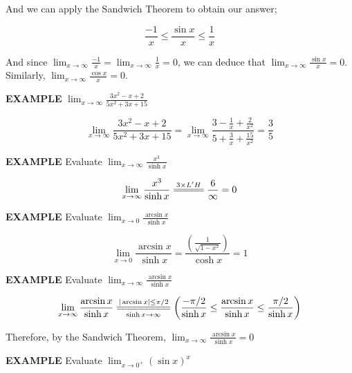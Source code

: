 \documentclass{article}
\begin{document}
\vspace{10pt}

And we can apply the Sandwich Theorem to obtain our answer;

\[\frac{-1}{x}\leq\frac{\sin x}{x}\leq\frac{1}{x}\]

\vspace{10pt}

And since $\lim_{x\to\infty}\frac{-1}{x}=\lim_{x\to\infty}\frac{1}{x}=0$, we can deduce that $\lim_{x\to\infty}\frac{\sin x}{x}=0$. Similarly, $\lim_{x\to\infty}\frac{\cos x}{x}=0$.

\vspace{10pt}

{\bf{}EXAMPLE} $\displaystyle\lim_{x\to\infty}\frac{3x^2-x+2}{5x^2+3x+15}$

\[\lim_{x\to\infty}\frac{3x^2-x+2}{5x^2+3x+15}=\lim_{x\to\infty}\frac{3-\frac{1}{x}+\frac{2}{x^2}}{5+\frac{3}{x}+\frac{15}{x^2}}=\frac{3}{5}\]

\vspace{10pt}

{\bf{}EXAMPLE} Evaluate $\displaystyle\lim_{x\to\infty}\frac{x^3}{\sinh x}$

\[\lim_{x\to\infty}\frac{x^3}{\sinh x}\overset{3\times L'H}{=\joinrel=\joinrel=\joinrel=\joinrel=}\frac{6}{\infty}=0\]

\vspace{10pt}

{\bf{}EXAMPLE} Evaluate $\displaystyle\lim_{x\to0}\frac{\arcsin x}{\sinh x}$

\[\lim_{x\to0}\frac{\arcsin x}{\sinh x}=\frac{\left(\frac{1}{\sqrt{1-x^2}}\right)}{\cosh x}=1\]

\vspace{10pt}

{\bf{}EXAMPLE} Evaluate $\displaystyle\lim_{x\to\infty}\frac{\arcsin x}{\sinh x}$

\[\lim_{x\to\infty}\frac{\arcsin x}{\sinh x}\overset{|\arcsin x|\leq\pi/2}{\underset{\sinh x\to\infty}{=\joinrel=\joinrel=\joinrel=\joinrel=\joinrel=\joinrel=\joinrel=\joinrel=}}\left(\frac{-\pi/2}{\sinh x}\leq\frac{\arcsin x}{\sinh x}\leq\frac{\pi/2}{\sinh x}\right)\]

\vspace{10pt}

Therefore, by the Sandwich Theorem, $\lim_{x\to\infty}\frac{\arcsin x}{\sinh x}=0$

\vspace{10pt}

{\bf{}EXAMPLE} Evaluate $\displaystyle\lim_{x\to0^+}(\sin x)^x$
\end{document}
